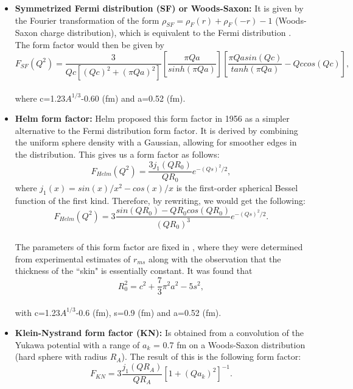 \begin{itemize}[leftmargin=*]
    \item \textbf{Symmetrized Fermi distribution (SF) or Woods-Saxon:} It is given by the Fourier transformation of the form $\rho_{SF}=\rho_F(r)+\rho_F(-r)-1$ (Woods-Saxon charge distribution), which is equivalent to the Fermi distribution \cite{Cadeddu_2018}. The form factor would then be given by
    \\
    \begin{equation}
        F_{SF}(Q^2)=\frac{3}{Qc\left[(Qc)^2+(\pi Qa)^2\right]}\left[\frac{\pi Qa}{sinh(\pi Q a)}\right]\left[\frac{\pi Q a sin(Qc)}{tanh(\pi Q a)}-Qc cos(Qc)\right],
    \end{equation}
    \\
    where c=1.23$A^{1/3}$-0.60 (fm) and a=0.52 (fm).

    \item \textbf{Helm form factor:} Helm proposed this form factor in 1956 as a simpler alternative to the Fermi distribution form factor. It is derived by combining the uniform sphere density with a Gaussian, allowing for smoother edges in the distribution. This gives us a form factor as follows:
    \\
    \begin{equation}
        F_{Helm}(Q^2)=\frac{3 j_1(QR_0)}{QR_0} e^{-(Qs)^2/2},
    \end{equation}
    where $j_1(x)=sin(x)/x^2 - cos(x)/x$ is the first-order spherical Bessel function of the first kind. Therefore, by rewriting, we would get the following:
    \\
    \begin{equation*}
        F_{Helm}(Q^2)=3 \frac{sin(QR_0)-QR_0 cos(QR_0)}{(QR_0)^3} e^{-(Qs)^2/2}.
    \end{equation*}
    \\
    The parameters of this form factor are fixed in \cite{LEWIN199687}, where they were determined from experimental estimates of $r_{ms}$ along with the observation that the thickness of the ``skin" is essentially constant. It was found that
    \\
    \begin{equation*}
        R_0^2=c^2+\frac{7}{3}\pi^2a^2-5s^2,
    \end{equation*}
    \\
    with c=1.23$A^{1/3}$-0.6 (fm), s=0.9 (fm) and a=0.52 (fm).
    
    \item\textbf{Klein-Nystrand form factor (KN):}  Is obtained from a convolution of the Yukawa potential with a range of $a_k$ = 0.7 fm on a Woods-Saxon distribution (hard sphere with radius $R_A$). The result of this is the following form factor:
    \\
    \begin{equation}
        F_{KN}=3 \frac{j_1(QR_A)}{QR_A} \left[1+(Q a_k)^2\right]^{-1}.
    \end{equation}
\end{itemize}

